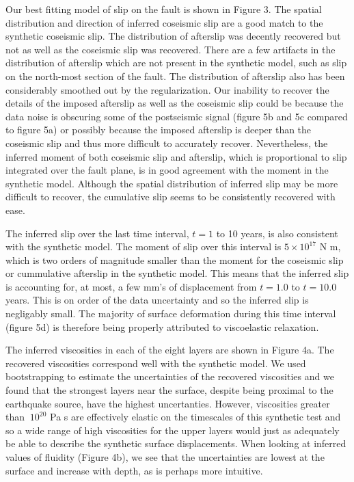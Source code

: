 \documentclass[extra]{gji}
\begin{document}
Our best fitting model of slip on the fault is shown in Figure 3.  The
spatial distribution and direction of inferred coseismic slip are a
good match to the synthetic coseismic slip.  The distribution of
afterslip was decently recovered but not as well as the coseismic slip
was recovered.  There are a few artifacts in the distribution of
afterslip which are not present in the synthetic model, such as slip
on the north-most section of the fault.  The distribution of afterslip
also has been considerably smoothed out by the regularization. Our
inability to recover the details of the imposed afterslip as well as
the coseismic slip could be because the data noise is obscuring some
of the postseismic signal (figure 5b and 5c compared to figure 5a) or
possibly because the imposed afterslip is deeper than the coseismic
slip and thus more difficult to accurately recover.  Nevertheless, the
inferred moment of both coseismic slip and afterslip, which is
proportional to slip integrated over the fault plane, is in good
agreement with the moment in the synthetic model.  Although the
spatial distribution of inferred slip may be more difficult to
recover, the cumulative slip seems to be consistently recovered with
ease.

The inferred slip over the last time interval, $t=1$ to 10 years, is
also consistent with the synthetic model.  The moment of slip over
this interval is $5\times 10^{17}$ N m, which is two orders of
magnitude smaller than the moment for the coseismic slip or
cummulative afterslip in the synthetic model.  This means that the
inferred slip is accounting for, at most, a few mm's of displacement
from $t=1.0$ to $t=10.0$ years.  This is on order of the data
uncertainty and so the inferred slip is negligably small.  The
majority of surface deformation during this time interval (figure 5d)
is therefore being properly attributed to viscoelastic relaxation.

The inferred viscosities in each of the eight layers are shown in
Figure 4a.  The recovered viscosities correspond well with the
synthetic model.  We used bootstrapping to estimate the uncertainties
of the recovered viscosities and we found that the strongest layers
near the surface, despite being proximal to the earthquake source,
have the highest uncertanties.  However, viscosities greater than
$~10^{20}$ Pa s are effectively elastic on the timescales of this
synthetic test and so a wide range of high viscosities for the upper
layers would just as adequately be able to describe the synthetic
surface displacements.  When looking at inferred values of fluidity
(Figure 4b), we see that the uncertainties are lowest at the surface
and increase with depth, as is perhaps more intuitive.
\end{document}
